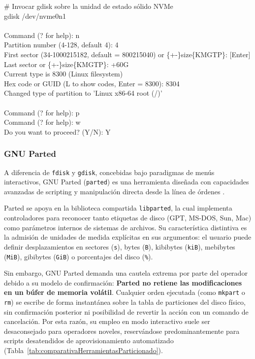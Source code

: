 \documentclass[12pt]{article}
\begin{document}
\begin{mdframed}[style=terminal]
\ttfamily\upshape\color{bashLetterColor}\footnotesize
\# Invocar gdisk sobre la unidad de estado sólido NVMe \\
gdisk /dev/nvme0n1 \\
\\
Command (? for help): n \\
Partition number (4-128, default 4): 4 \\
First sector (34-1000215182, default = 800215040) or \{+-\}size\{KMGTP\}: [Enter] \\
Last sector or \{+-\}size\{KMGTP\}: +60G \\
Current type is 8300 (Linux filesystem) \\
Hex code or GUID (L to show codes, Enter = 8300): 8304 \\
Changed type of partition to 'Linux x86-64 root (/)' \\
\\
Command (? for help): p \\
Command (? for help): w \\
Do you want to proceed? (Y/N): Y
\end{mdframed}

\subsubsection{GNU Parted}

A diferencia de \texttt{fdisk} y \texttt{gdisk}, concebidas bajo paradigmas de menús interactivos, GNU Parted (\texttt{parted}) es una herramienta diseñada con capacidades avanzadas de scripting y manipulación directa desde la línea de órdenes \parencite{gnuparted2024manual}. 

Parted se apoya en la biblioteca compartida \texttt{libparted}, la cual implementa controladores para reconocer tanto etiquetas de disco (GPT, MS-DOS, Sun, Mac) como parámetros internos de sistemas de archivos. Su característica distintiva es la admisión de unidades de medida explícitas en sus argumentos: el usuario puede definir desplazamientos en sectores (\texttt{s}), bytes (\texttt{B}), kibibytes (\texttt{kiB}), mebibytes (\texttt{MiB}), gibibytes (\texttt{GiB}) o porcentajes del disco (\texttt{\%}).

Sin embargo, GNU Parted demanda una cautela extrema por parte del operador debido a su modelo de confirmación: \textbf{Parted no retiene las modificaciones en un búfer de memoria volátil}. Cualquier orden ejecutada (como \texttt{mkpart} o \texttt{rm}) se escribe de forma instantánea sobre la tabla de particiones del disco físico, sin confirmación posterior ni posibilidad de revertir la acción con un comando de cancelación. Por esta razón, su empleo en modo interactivo suele ser desaconsejado para operadores noveles, reservándose predominantemente para scripts desatendidos de aprovisionamiento automatizado (Tabla~\ref{tab:comparativaHerramientasParticionado}).
\end{document}
